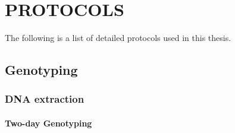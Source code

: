 
\chapter{\uppercase {Protocols}}

The following is a list of detailed protocols used in this thesis.

\section{Genotyping}

\subsection{DNA extraction}
\subsubsection*{Two-day Genotyping}


